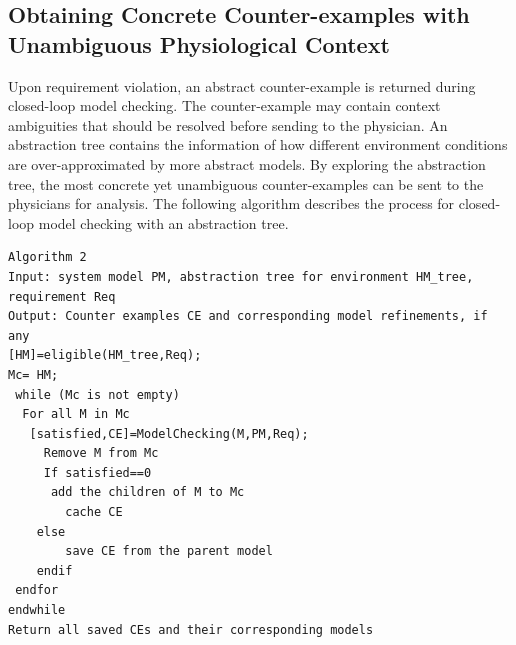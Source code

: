 \subsection{Obtaining Concrete Counter-examples with Unambiguous Physiological Context}
Upon requirement violation, an abstract counter-example is returned during closed-loop model checking. The counter-example may contain context ambiguities that should be resolved before sending to the physician. An abstraction tree contains the information of how different environment conditions are over-approximated by more abstract models. By exploring the abstraction tree, the most concrete yet unambiguous counter-examples can be sent to the physicians for analysis. The following algorithm describes the process for closed-loop model checking with an abstraction tree.
\begin{Verbatim}
Algorithm 2
Input: system model PM, abstraction tree for environment HM_tree, requirement Req
Output: Counter examples CE and corresponding model refinements, if any
[HM]=eligible(HM_tree,Req);
Mc= HM;
 while (Mc is not empty)
  For all M in Mc
   [satisfied,CE]=ModelChecking(M,PM,Req);
	 Remove M from Mc
	 If satisfied==0
	  add the children of M to Mc
		cache CE
	else
		save CE from the parent model
	endif
 endfor
endwhile
Return all saved CEs and their corresponding models
\end{Verbatim}

